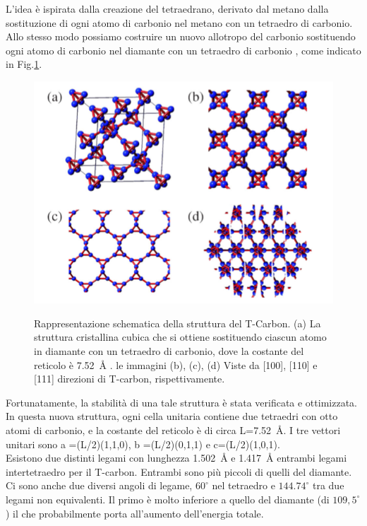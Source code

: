 \documentclass[a4paper,titlepage]{book}
\begin{document}
L'idea è ispirata dalla creazione del tetraedrano, derivato dal metano dalla sostituzione di ogni atomo di carbonio nel metano con un tetraedro di carbonio.\\
Allo stesso modo possiamo costruire un nuovo allotropo del carbonio sostituendo ogni atomo di carbonio nel diamante con un tetraedro di carbonio , come indicato in Fig.\ref{TCarb}.\\
\begin{figure}[h!] 
	\centering \label{TCarb}
	\includegraphics[width=0.55\columnwidth]{TCarbon.png}
	\caption{ 	Rappresentazione schematica della struttura del T-Carbon. (a) La struttura cristallina cubica che si ottiene sostituendo ciascun atomo in diamante con un tetraedro di carbonio, dove la costante del reticolo è \SI{7,52}{\angstrom} . le immagini (b), (c), (d) Viste da [100], [110] e [111] direzioni di T-carbon, rispettivamente.	}
\end{figure}
Fortunatamente, la stabilità di una tale struttura è stata verificata e ottimizzata. In questa nuova struttura, ogni cella unitaria contiene due tetraedri con otto atomi di carbonio, e la costante del reticolo è di circa L=\SI{7,52}{\angstrom}. I tre vettori unitari sono a =(L/2)(1,1,0), b =(L/2)(0,1,1) e c=(L/2)(1,0,1).\\
Esistono due distinti legami con lunghezza  \SI{1.502}{\angstrom} e \SI{1.417}{\angstrom} entrambi legami intertetraedro per il T-carbon. Entrambi sono più piccoli di quelli del diamante. Ci sono anche due diversi angoli di legame, $60^\circ$ nel tetraedro e $144.74^\circ$ tra due legami non equivalenti. Il primo è molto inferiore a quello del diamante (di $109,5^\circ$) il che probabilmente porta all'aumento dell'energia totale.
\end{document}
